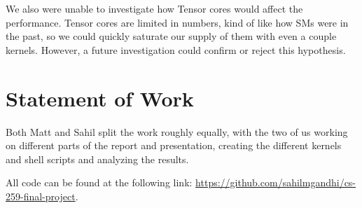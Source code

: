 \documentclass[sigconf]{acmart}
\begin{document}
We also were unable to investigate how Tensor cores would affect the performance. Tensor cores are limited in numbers, kind of like how SMs were in the past, so we could quickly saturate our supply of them with even a couple kernels. However, a future investigation could confirm or reject this hypothesis.


\section{Statement of Work}
Both Matt and Sahil split the work roughly equally, with the two of us working on different parts of the report and presentation, creating the different kernels and shell scripts and analyzing the results.

All code can be found at the following link: \url{https://github.com/sahilmgandhi/cs-259-final-project}.








\end{document}
